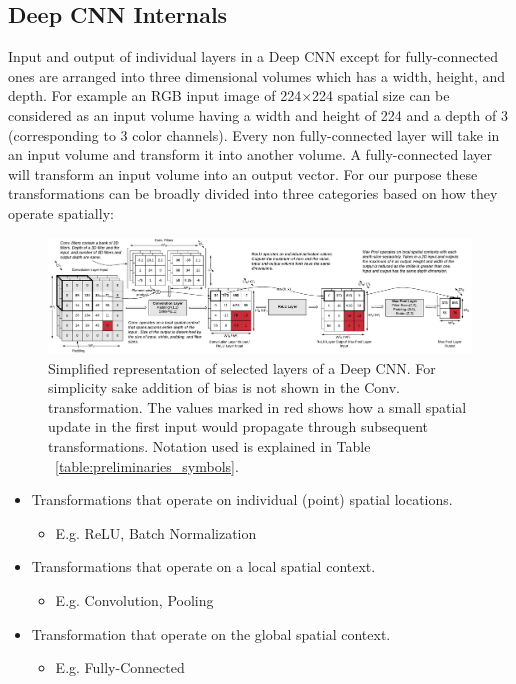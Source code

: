 \subsection{Deep CNN Internals}
Input and output of individual layers in a Deep CNN except for fully-connected ones are arranged into three dimensional volumes which has a width, height, and depth.
For example an RGB input image of 224$\times$224 spatial size can be considered as an input volume having a width and height of 224 and a depth of 3 (corresponding to 3 color channels). Every non fully-connected layer will take in an input volume and transform it into another volume.
A fully-connected layer will transform an input volume into an output vector. For our purpose these transformations can be broadly divided into three categories based on how they operate spatially:

\begin{figure}[t]
\includegraphics[width=\textwidth]{images/cnn_simplified}
\caption{Simplified representation of selected layers of a Deep CNN. For simplicity sake addition of bias is not shown in the Conv. transformation. The values marked in red shows how a small spatial update in the first input would propagate through subsequent transformations. Notation used is explained in Table ~\ref{table:preliminaries_symbols}.}
\label{fig:cnn_simplified}
\end{figure}

\begin{itemize}
	\item Transformations that operate on individual (point) spatial locations.
	\begin{itemize}
	 \item E.g. ReLU, Batch Normalization
	\end{itemize}
	\item Transformations that operate on a local spatial context.
	\begin{itemize}
	 \item E.g. Convolution, Pooling
	\end{itemize}
	\item Transformation that operate on the global spatial context.
	\begin{itemize}
	 \item E.g. Fully-Connected
	\end{itemize}
\end{itemize}

